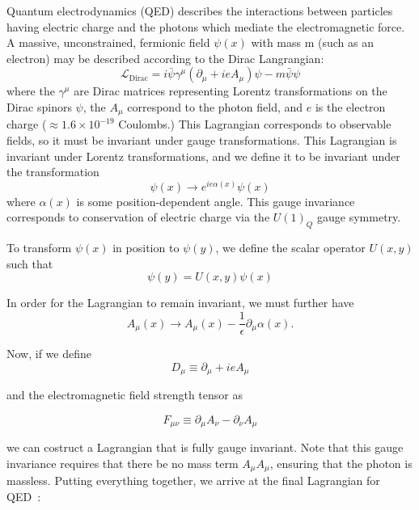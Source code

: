 Quantum electrodynamics (QED) describes the interactions between particles having electric charge and the photons which mediate the electromagnetic force. A massive, unconstrained, fermionic field $\psi(x)$ with mass m (such as an electron) may be described according to the Dirac Langrangian\cite{srednicki}:
\begin{equation}
\mathcal{L}_{\text{Dirac}} = i\bar{\psi}\gamma^{\mu}\left(\partial_{\mu} + ieA_{\mu}\right)\psi - m\bar{\psi}\psi
\end{equation}
where the $\gamma^{\mu}$ are Dirac matrices representing Lorentz transformations on the Dirac spinors $\psi$, the $A_{\mu}$ correspond to the photon field, and $e$ is the electron charge ($\approx 1.6 \times 10^{-19}$ Coulombs.) This Lagrangian corresponds to observable fields, so it must be invariant under gauge transformations. This Lagrangian is invariant under Lorentz transformations, and we define it to be invariant under the transformation
\begin{equation}
\psi(x) \to e^{ie\alpha(x)}\psi(x)
\end{equation}
where $\alpha(x)$ is some position-dependent angle. This gauge invariance corresponds to conservation of electric charge via the $U(1)_Q$ gauge symmetry.

To transform $\psi(x)$ in position to $\psi(y)$, we define the scalar operator $U(x, y)$ such that
\begin{equation}
\psi(y) = U(x, y)\psi(x)
\end{equation}

\noindent In order for the Lagrangian to remain invariant, we must further have
\begin{equation}
A_{\mu}(x) \to A_{\mu}(x) - \frac{1}{\epsilon}\partial_{\mu}\alpha(x).
\end{equation}

\noindent Now, if we define
\begin{equation}
D_{\mu} \equiv \partial_{\mu} + ieA_{\mu}
\end{equation}

\noindent and the electromagnetic field strength tensor as

\begin{equation}
 F_{\mu\nu} \equiv \partial_{\mu}A_{\nu} - \partial_{\nu}A_{\mu}
\end{equation}

\noindent we can costruct a Lagrangian that is fully gauge invariant. Note that this gauge invariance requires that there be no mass term $A_{\mu}A_{\mu}$, ensuring that the photon is massless. Putting everything together, we arrive at the final Lagrangian for QED~\cite{halzen}:

